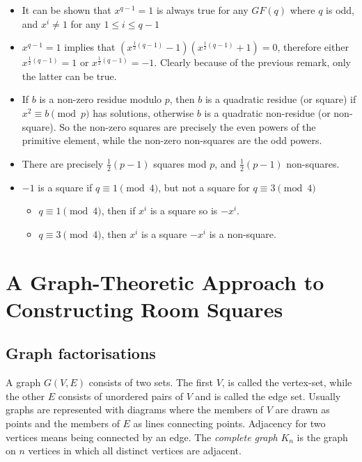 \documentclass[
  11pt,
  a4paper]{book}
\begin{document}
\begin{itemize}
\item
  It can be shown \textcite{bose_resolvable_1947} that \(x^{q-1}=1\) is always
  true for any \(GF(q)\)
  where \(q\) is odd, and \(x^i \neq 1\) for any \(1 \leq i \leq q-1\)
\item
  \(x^{q-1}=1\) implies that
  \((x^{\frac{1}{2}(q - 1)} - 1)(x^{\frac{1}{2}(q - 1)} + 1) = 0\), therefore
  either \(x^{\frac{1}{2}(q - 1)} = 1\) or \(x^{\frac{1}{2}(q - 1)} = -1\).
  Clearly because of the previous remark, only the latter can be true.
\item
  If \(b\) is a non-zero residue modulo \(p\), then \(b\) is a quadratic
  residue (or square) if \(x^2 \equiv b \pmod p\) has
  solutions, otherwise \(b\) is a quadratic non-residue (or non-square).
  So the non-zero squares are precisely the even powers of the
  primitive element, while the non-zero non-squares are the odd
  powers.
\item
  There are precisely \(\frac{1}{2}(p - 1)\) squares mod \(p\), and
  \(\frac{1}{2}(p - 1)\) non-squares.
\item
  \(-1\) is a square if \(q \equiv 1 \pmod 4\), but not a square
  for \(q \equiv 3 \pmod 4\)

  \begin{itemize}
  \item
    \(q \equiv 1 \pmod 4\), then if \(x^i\) is a square so is
    \(-x^i\).
  \item
    \(q \equiv 3 \pmod 4\), then \(x^i\) is a square \(-x^i\) is
    a non-square.
  \end{itemize}
\end{itemize}

\hypertarget{a-graph-theoretic-approach-to-constructing-room-squares}{%
\chapter{A Graph-Theoretic Approach to Constructing Room Squares}\label{a-graph-theoretic-approach-to-constructing-room-squares}}

\hypertarget{graph-factorisations}{%
\section{Graph factorisations}\label{graph-factorisations}}

A graph \(G(V,E)\) consists of two sets. The first \(V\),
is called the vertex-set, while the other \(E\) consists
of unordered pairs of \(V\) and is called the edge set.
Usually graphs are represented with diagrams where the
members of \(V\) are drawn as points and the members of
\(E\) as lines connecting points. Adjacency for two vertices
means being connected by an edge. The \emph{complete graph}
\(K_n\) is the graph on \(n\) vertices in which all distinct
vertices are adjacent.
\end{document}
